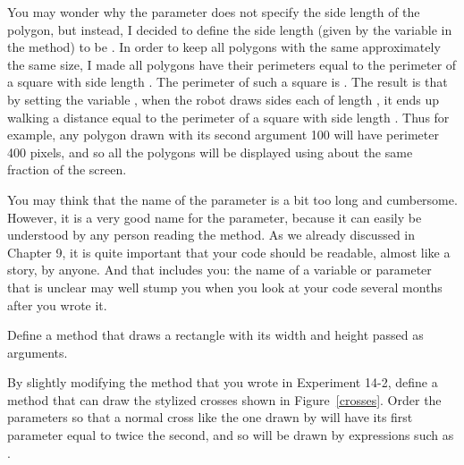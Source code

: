 \documentclass[a4paper,10pt,twoside]{book}
\begin{document}
You may wonder why the parameter  does not specify the side length of the 
polygon, but instead, I decided to define the side length (given by the variable  
in the method) to be . In order to keep all polygons with the 
same  approximately the same size, I made all polygons have their perimeters equal 
to the perimeter of a square with side length . The perimeter of such a square is . The result is that by setting the variable , when the robot draws  sides each of length , it 
ends up walking a distance equal to the perimeter of a square with side length . 
Thus for example, any polygon drawn with its second argument 100 will have perimeter 400 
pixels, and so all the polygons will be displayed using about the same fraction of the screen. 

You may think that the name of the parameter  is a bit too long and 
cumbersome. However, it is a very good name for the parameter, because it can easily be 
understood by any person reading the method. As we already discussed in Chapter 9, it is 
quite important that your code should be readable, almost like a story, by anyone. And that 
includes you: the name of a variable or parameter that is unclear may well stump you when 
you look at your code several months after you wrote it. 


\begin{exonofig}
Define a method  that draws a rectangle with its width and height passed as arguments. 
\end{exonofig}


\begin{exonofig}
By slightly modifying the method  that you wrote in Experiment 14-2, define a method   that can draw the stylized crosses shown in Figure~\ref{crosses}. Order the parameters so that a normal cross like the one  drawn by  will have its first parameter equal to twice the second, and so will be drawn by expressions  such as . 
\end{exonofig}
\end{document}
